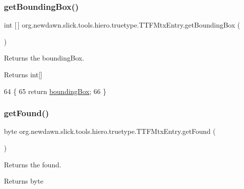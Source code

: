\subsubsection{\texorpdfstring{get\+Bounding\+Box()}{getBoundingBox()}}
{\footnotesize\ttfamily int \mbox{[}$\,$\mbox{]} org.\+newdawn.\+slick.\+tools.\+hiero.\+truetype.\+T\+T\+F\+Mtx\+Entry.\+get\+Bounding\+Box (\begin{DoxyParamCaption}{ }\end{DoxyParamCaption})\hspace{0.3cm}{\ttfamily [inline]}}

Returns the bounding\+Box. \begin{DoxyReturn}{Returns}
int\mbox{[}\mbox{]} 
\end{DoxyReturn}

\begin{DoxyCode}
64                                   \{
65         \textcolor{keywordflow}{return} \mbox{\hyperlink{classorg_1_1newdawn_1_1slick_1_1tools_1_1hiero_1_1truetype_1_1_t_t_f_mtx_entry_a7a0560528ae8fca8245ac8ee8de2714e}{boundingBox}};
66     \}
\end{DoxyCode}
\mbox{\label{classorg_1_1newdawn_1_1slick_1_1tools_1_1hiero_1_1truetype_1_1_t_t_f_mtx_entry_a39f29940a581af42afa410254f738661}} 
\subsubsection{\texorpdfstring{get\+Found()}{getFound()}}
{\footnotesize\ttfamily byte org.\+newdawn.\+slick.\+tools.\+hiero.\+truetype.\+T\+T\+F\+Mtx\+Entry.\+get\+Found (\begin{DoxyParamCaption}{ }\end{DoxyParamCaption})\hspace{0.3cm}{\ttfamily [inline]}}

Returns the found. \begin{DoxyReturn}{Returns}
byte 
\end{DoxyReturn}

